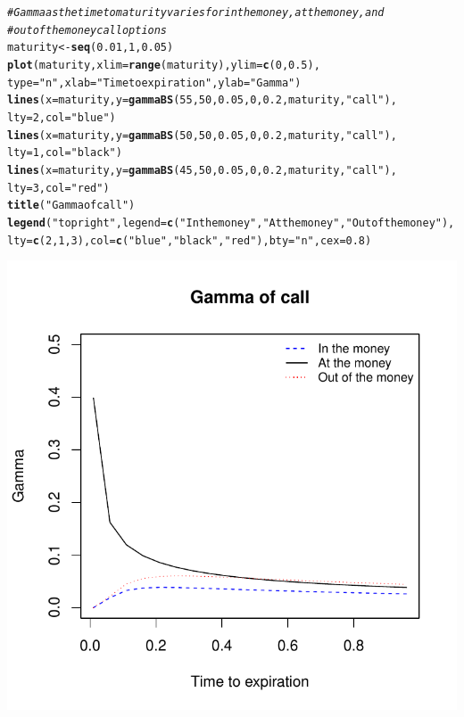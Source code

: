 \documentclass{article}\usepackage[]{graphicx}\usepackage[]{color}
\makeatletter
\def\maxwidth{ %
  \ifdim\Gin@nat@width>\linewidth
    \linewidth
  \else
    \Gin@nat@width
  \fi
}
\newcommand{\hlstr}[1]{\textcolor[rgb]{0.192,0.494,0.8}{#1}}%
\newcommand{\hlcom}[1]{\textcolor[rgb]{0.678,0.584,0.686}{\textit{#1}}}%
\newcommand{\hlkwd}[1]{\textcolor[rgb]{0.737,0.353,0.396}{\textbf{#1}}}%
\newenvironment{kframe}{%
 \def\at@end@of@kframe{}%
 \ifinner\ifhmode%
  \def\at@end@of@kframe{\end{minipage}}%
  \begin{minipage}{\columnwidth}%
 \fi\fi%
 \def\FrameCommand##1{\hskip\@totalleftmargin \hskip-\fboxsep
 \colorbox{shadecolor}{##1}\hskip-\fboxsep
     \hskip-\linewidth \hskip-\@totalleftmargin \hskip\columnwidth}%
 \MakeFramed {\advance\hsize-\width
   \@totalleftmargin\z@ \linewidth\hsize
   \@setminipage}}%
 {\par\unskip\endMakeFramed%
 \at@end@of@kframe}
\newenvironment{knitrout}{}{} %
\makeatother
\begin{document}
\begin{knitrout}
\color{fgcolor}\begin{kframe}
\begin{alltt}
\hlcom{# Gamma as the time to maturity varies for in the money, at the money, and}
\hlcom{# out of the money call options}
maturity <- \hlkwd{seq}(0.01, 1, 0.05)
\hlkwd{plot}(maturity, xlim = \hlkwd{range}(maturity), ylim = \hlkwd{c}(0,0.5), 
     type=\hlstr{"n"}, xlab=\hlstr{"Time to expiration"}, ylab=\hlstr{"Gamma"})
\hlkwd{lines}(x = maturity, y = \hlkwd{gammaBS}(55, 50, 0.05, 0, 0.2, maturity, \hlstr{"call"}), 
      lty=2, col=\hlstr{"blue"})
\hlkwd{lines}(x = maturity, y = \hlkwd{gammaBS}(50, 50, 0.05, 0, 0.2, maturity, \hlstr{"call"}), 
      lty=1, col=\hlstr{"black"})
\hlkwd{lines}(x = maturity, y = \hlkwd{gammaBS}(45, 50, 0.05, 0, 0.2, maturity, \hlstr{"call"}), 
      lty=3, col=\hlstr{"red"})
\hlkwd{title}(\hlstr{"Gamma of call"})
\hlkwd{legend}(\hlstr{"topright"}, legend=\hlkwd{c}(\hlstr{"In the money"}, \hlstr{"At the money"}, \hlstr{"Out of the money"}),
       lty=\hlkwd{c}(2,1,3), col=\hlkwd{c}(\hlstr{"blue"}, \hlstr{"black"}, \hlstr{"red"}), bty=\hlstr{"n"}, cex=0.8)
\end{alltt}
\end{kframe}
\includegraphics[width=\maxwidth]{figure/unnamed-chunk-17} 

\end{knitrout}
\end{document}
